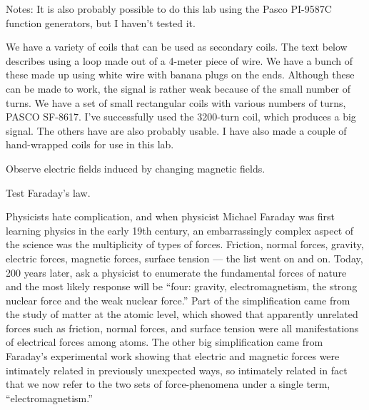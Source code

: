 \label{lab:faraday}

\apparatus
{}

Notes: It is also probably possible to do this lab using the Pasco PI-9587C function
generators, but I haven't tested it.

We have a variety of coils that can be used as secondary coils. The text below describes
using a loop made out of a 4-meter piece of wire. We have a bunch of these made up
using white wire with banana plugs on the ends. Although these can be made to work,
the signal is rather weak because of the small number of turns. We have a set of
small rectangular coils with various numbers of turns, PASCO SF-8617. I've successfully
used the 3200-turn coil, which produces a big signal. The others have are also probably
usable. I have also made a couple of hand-wrapped coils for use in this lab.

\begin{goals}

\item[] Observe electric fields induced by changing magnetic fields.

\item[] Test Faraday's law.
\end{goals}

\introduction

Physicists hate complication, and when physicist Mi\-ch\-a\-el
Faraday was first learning physics in the early 19th
century, an embarrassingly complex aspect of the science was
the multiplicity of types of forces. Friction, normal
forces, gravity, electric forces, magnetic forces, surface
tension --- the list went on and on. Today, 200 years later,
ask a physicist to enumerate the fundamental forces of
nature and the most likely response will be ``four: gravity,
electromagnetism, the strong nuclear force and the weak
nuclear force.'' Part of the simplification came from the
study of matter at the atomic level, which showed that
apparently unrelated forces such as friction, normal forces,
and surface tension were all manifestations of electrical
forces among atoms. The other big simplification came from
Faraday's experimental work showing that electric and
magnetic forces were intimately related in previously
unexpected ways, so intimately related in fact that we now
refer to the two sets of force-phenomena under a single
term, ``electromagnetism.''


